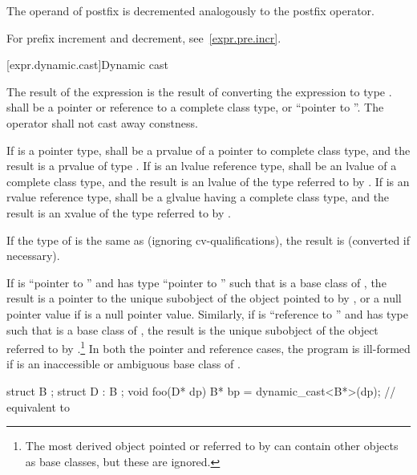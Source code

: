 \pnum
{}%
%
%
%
The operand of postfix \tcode{\dcr} is decremented analogously to the
postfix \tcode{++} operator.
\begin{note}
For prefix increment and decrement, see~\ref{expr.pre.incr}.
\end{note}

[expr.dynamic.cast]{Dynamic cast}

\pnum
{}%
%
The result of the expression  is the result of
converting the expression  to type .
%
 shall be a pointer or reference to a complete class type, or
``pointer to \cv{} ''. The  operator shall not cast
away constness.

\pnum
If  is a pointer type,  shall be a prvalue of a
pointer to complete class type, and the result is a prvalue of type
. If  is an lvalue reference type,  shall be
an lvalue of a complete class type, and the result is an lvalue of the
type referred to by . If  is an rvalue reference type,
 shall be a glvalue having a complete class type, and the
result is an xvalue of the type referred to by .

\pnum
If the type of  is the same as  (ignoring cv-qualifications),
the result is
 (converted if necessary).

\pnum
If  is ``pointer to  '' and  has
type ``pointer to  '' such that  is a base
class of , the result is a pointer to the unique 
subobject of the  object pointed to by , or
a null pointer value if  is a null pointer value.
Similarly, if
 is ``reference to  '' and  has
type   such that  is a base class of
, the result is the unique  subobject of the 
object referred to by .\footnote{The most derived
object pointed or referred to by
 can contain other  objects as base classes, but these
are ignored.}
In both the pointer and
reference cases, the program is ill-formed if  is an inaccessible or
ambiguous base class of .
\begin{example}
\begin{codeblock}
struct B { };
struct D : B { };
void foo(D* dp) {
  B*  bp = dynamic_cast<B*>(dp);    // equivalent to 
}
\end{codeblock}
\end{example}

